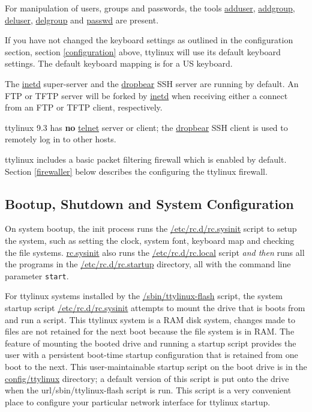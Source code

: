 \documentclass[10pt]{article}
\begin{document}
For manipulation of users, groups and passwords, the tools \url{adduser},
\url{addgroup}, \url{deluser}, \url{delgroup} and \url{passwd} are present.

If you have not changed the keyboard settings as outlined in the configuration
section, section \ref{configuration} above, ttylinux will use its default
keyboard settings. The default keyboard mapping is for a US keyboard.

The \url{inetd} super-server and the \url{dropbear} SSH server are running by
default. An FTP or TFTP server will be forked by \url{inetd} when receiving
either a connect from an FTP or TFTP client, respectively.

ttylinux 9.3 has {\bf no} \url{telnet} server or client; the \url{dropbear} SSH
client is used to remotely log in to other hosts.

ttylinux includes a basic packet filtering firewall which is enabled by
default. Section \ref{firewaller} below describes the configuring the ttylinux
firewall.

\subsection{Bootup, Shutdown and System Configuration}
\label{startup}

On system bootup, the init process runs the \url{/etc/rc.d/rc.sysinit} script
to setup the system, such as setting the clock, system font, keyboard map and
checking the file systems. \url{rc.sysinit} also runs the
\url{/etc/rc.d/rc.local} script {\it and then} runs all the programs in the
\url{/etc/rc.d/rc.startup} directory, all with the command line parameter
{\tt start}.

For ttylinux systems installed by the \url{/sbin/ttylinux-flash} script, the
system startup script \url{/etc/rc.d/rc.sysinit} attempts to mount the drive
that is boots from and run a script. This ttylinux system is a RAM disk system,
changes made to files are not retained for the next boot because the file
system is in RAM. The feature of mounting the booted drive and running a
startup script provides the user with a persistent boot-time startup
configuration that is retained from one boot to the next. This
user-maintainable startup script on the boot drive is in the
\url{config/ttylinux} directory; a default version of this script is put onto
the drive when the url{/sbin/ttylinux-flash} script is run. This script is a
very convenient place to configure your particular network interface for
ttylinux startup.
\end{document}
